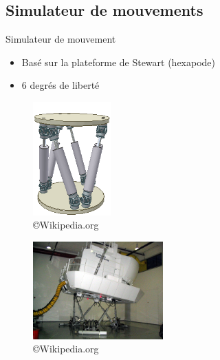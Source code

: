 \subsection{Simulateur de mouvements}
\begin{frame}{Simulateur de mouvement}
\begin{itemize}
\item Basé sur la plateforme de Stewart (hexapode)
\item 6 degrés de liberté
\end{itemize}
\begin{multicols}{2}
\begin{figure}
\centering
\includegraphics[width=3cm]{images/Hexapod}
\caption{\copyright Wikipedia.org}
\end{figure}
\begin{figure}
\centering
\includegraphics[width=5cm]{images/Simulator-flight}
\caption{\copyright Wikipedia.org}
\end{figure}
\end{multicols}
\end{frame}

